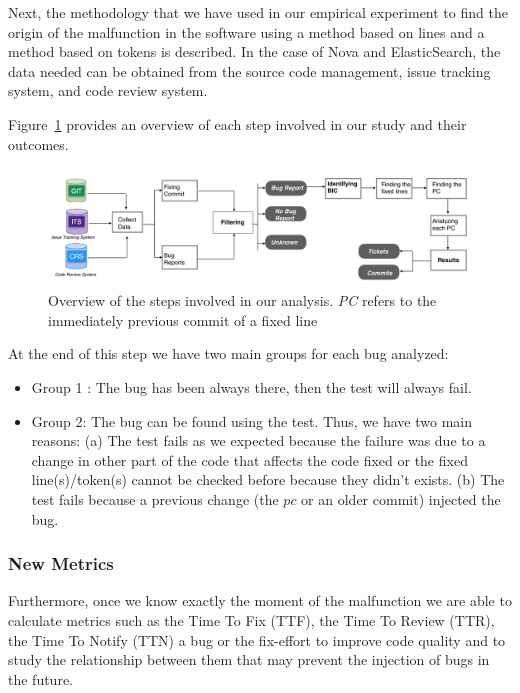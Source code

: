 \documentclass[a4paper]{article}
\begin{document}
Next, the methodology that we have used in our empirical experiment to find the origin of the malfunction in the software using a method based on lines and a method based on tokens is described. In the case of Nova and ElasticSearch, the data needed can be obtained from the source code management, issue tracking system, and code review system. 

Figure~\ref{fig:diagram} provides an overview of each step involved in our study and their outcomes.

\begin{figure}[ht]
\centering
\includegraphics[width=\columnwidth]{diagram.png}
\caption{Overview of the steps involved in our analysis. \emph{PC} refers to the immediately previous commit of a fixed line }
\label{fig:diagram}       %
\end{figure}

At the end of this step we have two main groups for each bug analyzed:
\begin{itemize}
	\item Group 1 : The bug has been always there, then the test will always fail.
	\item Group 2: The bug can be found using the test. Thus, we have two main reasons: (a) The test fails as we expected because the failure was due to a change in other part of the code that affects the code fixed or  the fixed line(s)/token(s) cannot be checked before because they didn't exists. (b) The test fails because a previous change (the $pc$ or an older commit) injected the bug.
\end{itemize}

\subsubsection{New Metrics}

Furthermore, once we know exactly the moment of the malfunction we are able to calculate metrics such as the Time To Fix (TTF), the Time To Review (TTR), the Time To Notify (TTN) a bug or the fix-effort to improve code quality and to study the relationship between them that may prevent the injection of bugs in the future.
\end{document}
